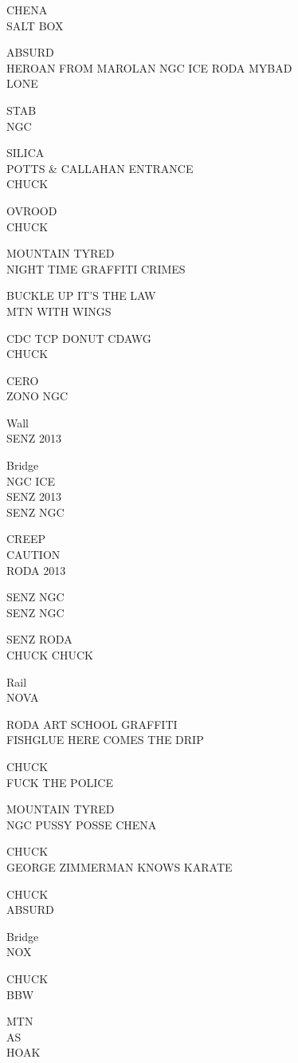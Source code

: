 \documentclass[10pt,letterpaper]{article}
\begin{document}
CHENA\\
SALT BOX

ABSURD\\
HEROAN FROM MAROLAN NGC ICE RODA MYBAD\\
LONE

STAB\\
NGC

SILICA\\
POTTS \& CALLAHAN ENTRANCE\\
CHUCK

OVROOD\\
CHUCK

MOUNTAIN TYRED\\
NIGHT TIME GRAFFITI CRIMES

BUCKLE UP IT'S THE LAW\\
MTN WITH WINGS

CDC TCP DONUT CDAWG\\
CHUCK

CERO\\
ZONO NGC

Wall\\
SENZ 2013

Bridge\\
NGC ICE\\
SENZ 2013\\
SENZ NGC

CREEP\\
CAUTION\\
RODA 2013

SENZ NGC\\
SENZ NGC

SENZ RODA\\
CHUCK CHUCK

Rail\\
NOVA

RODA ART SCHOOL GRAFFITI\\
FISHGLUE HERE COMES THE DRIP

CHUCK\\
FUCK THE POLICE

MOUNTAIN TYRED\\
NGC PUSSY POSSE CHENA

CHUCK\\
GEORGE ZIMMERMAN KNOWS KARATE

CHUCK\\
ABSURD

Bridge\\
NOX

CHUCK\\
BBW

MTN\\
AS\\
HOAK
\end{document}
